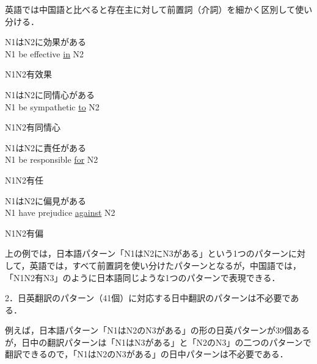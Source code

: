 \documentclass[japanese]{jnlp_1.4}
\newcommand{\inHZ}{}
\newcommand{\inHRei}[1]{}
\begin{document}
\inHZ
{}英語では中国語と比べると存在主に対して前置詞（介詞）を細かく区別して使い分ける．

\inHRei{(1)}
N1はN2に効果がある\\
N1 be effective \ul{in} N2\\
\begin{簡体中文}N1\ul{\mbox{}}N2有效果\end{簡体中文}

\inHRei{(2)}
N1はN2に同情心がある\\
N1 be sympathetic \ul{to} N2\\
\begin{簡体中文}N1\ul{\mbox{}}N2有同情心\end{簡体中文}

\inHRei{(3)}
N1はN2に責任がある\\
N1 be responsible \ul{for} N2\\
\begin{簡体中文}N1\ul{\mbox{}}N2有任\end{簡体中文}

\inHRei{(4)}
N1はN2に偏見がある\\
N1 have prejudice \ul{\mbox{against}} N2\\
\begin{簡体中文}N1\ul{\mbox{}}N2有偏\end{簡体中文}

上の例では，日本語パターン「N1はN2にN3がある」という1つのパターンに対して，英語では，すべて前置詞を使い分けたパターンとなるが，中国語では，「N1N2有N3」のように日本語同じような1つのパターンで表現できる．

\inHZ
2．日英翻訳のパターン（41個）に対応する日中翻訳のパターンは不必要である．

例えば，日本語パターン「N1はN2のN3がある」の形の日英パターンが39個あるが，日中の翻訳パターンは「N1はN3がある」と「N2のN3」の二つのパターンで翻訳できるので，「N1はN2のN3がある」の日中パターンは不必要である．
\end{document}
